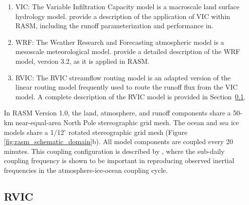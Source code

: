 \documentclass[jgrga, draft]{agutex}
\begin{document}
\begin{article}
\begin{enumerate}
\item VIC: The Variable Infiltration Capacity model \citep{Liang_1994} is a macroscale land surface hydrology model.
\citet{Hamman_2016} provide a description of the application of VIC within RASM, including the runoff parameterization and performance in.
\item WRF: The Weather Research and Forecasting atmospheric model \citep{Skamarock_2007} is a mesoscale meteorological model.
\citet{Cassano_2016} provide a detailed description of the WRF model, version 3.2, as it is applied in RASM.
\item RVIC: The RVIC streamflow routing model is an adapted version of the \citet{Lohmann_1996} linear routing model frequently used to route the runoff flux from the VIC model.
A complete description of the RVIC model is provided in Section~\ref{sec:rvic}.
\end{enumerate}

In RASM Version 1.0, the land, atmosphere, and runoff components share a 50-km near-equal-area North Pole stereographic grid mesh.
The ocean and sea ice models share a 1/12$^{\circ}$ rotated stereographic grid mesh (Figure \ref{fig:rasm_schematic_domain}b).
All model components are coupled every 20 minutes.
This coupling configuration is described by \citet{Roberts_2015a}, where the sub-daily coupling frequency is shown to be important in reproducing observed inertial frequencies in the atmosphere-ice-ocean coupling cycle.

\subsection{RVIC}
\label{sec:rvic}


\end{article}
\end{document}
